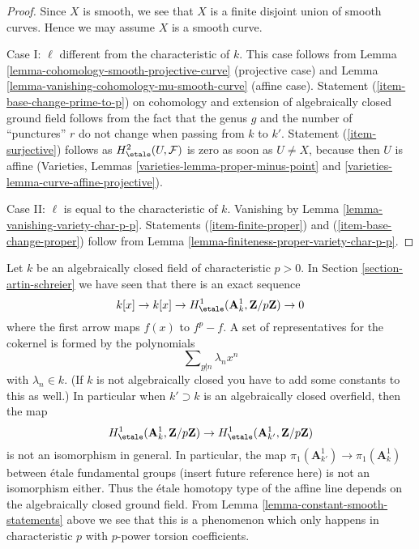 \begin{proof}
Since $X$ is smooth, we see that $X$ is a finite disjoint union of
smooth curves. Hence we may assume $X$ is a smooth curve.

\medskip\noindent
Case I: $\ell$ different from the characteristic of $k$.
This case follows from
Lemma \ref{lemma-cohomology-smooth-projective-curve}
(projective case) and
Lemma \ref{lemma-vanishing-cohomology-mu-smooth-curve}
(affine case). Statement (\ref{item-base-change-prime-to-p})
on cohomology and extension of algebraically closed ground
field follows from the fact that the genus $g$ and the number
of ``punctures'' $r$ do not change when passing from $k$ to $k'$.
Statement (\ref{item-surjective}) follows as $H^2_\etale(U, \mathcal{F})$
is zero as soon as $U \not = X$, because then $U$ is affine
(Varieties, Lemmas \ref{varieties-lemma-proper-minus-point} and
\ref{varieties-lemma-curve-affine-projective}).

\medskip\noindent
Case II: $\ell$ is equal to the characteristic of $k$.
Vanishing by Lemma \ref{lemma-vanishing-variety-char-p-p}.
Statements (\ref{item-finite-proper}) and (\ref{item-base-change-proper})
follow from
Lemma \ref{lemma-finiteness-proper-variety-char-p-p}.
\end{proof}

\begin{remark}
\label{remark-invariance}
Let $k$ be an algebraically closed field of characteristic $p > 0$.
In Section \ref{section-artin-schreier} we have seen that there is
an exact sequence
$$
k[x] \to k[x] \to
H^1_\etale(\mathbf{A}^1_k, \mathbf{Z}/p\mathbf{Z}) \to 0
$$
where the first arrow maps $f(x)$ to $f^p - f$. A set of representatives
for the cokernel is formed by the polynomials
$$
\sum\nolimits_{p \not | n} \lambda_n x^n
$$
with $\lambda_n \in k$. (If $k$ is not algebraically closed
you have to add some constants to this as well.) In particular
when $k' \supset k$ is an algebraically closed overfield, then
the map
$$
H^1_\etale(\mathbf{A}^1_k, \mathbf{Z}/p\mathbf{Z})
\to
H^1_\etale(\mathbf{A}^1_{k'}, \mathbf{Z}/p\mathbf{Z})
$$
is not an isomorphism in general. In particular, the map
$\pi_1(\mathbf{A}^1_{k'}) \to \pi_1(\mathbf{A}^1_k)$
between \'etale fundamental groups (insert future reference here)
is not an isomorphism either. Thus the \'etale homotopy type
of the affine line depends on the algebraically closed ground field.
From Lemma \ref{lemma-constant-smooth-statements} above we see that
this is a phenomenon which only happens in characteristic $p$
with $p$-power torsion coefficients.
\end{remark}

